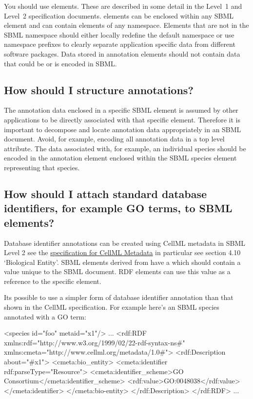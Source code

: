 \documentclass{sbmlfaq}
\begin{document}
You should use  elements.  These are described in some detail in the Level~1 and Level~2
specification documents.   elements can be enclosed within any SBML element and can contain
elements of any namespace. Elements that are not in the SBML namespace should either locally redefine the default namespace
or use namespace prefixes to clearly separate application specific data from different software packages.
Data stored in annotation elements should not contain data that could be or is encoded in SBML.  

\subsection{How should I structure annotations?}

The annotation data enclosed in a specific SBML element is
assumed by other applications to be directly associated with that specific element.
Therefore it is important to decompose and locate annotation data appropriately in an SBML document.
Avoid, for example, encoding all annotation data in a top level attribute.
The data associated
with, for example, an individual species should be encoded in the annotation element enclosed within
the SBML species element representing that species.

\subsection{How should I attach standard database identifiers, for example GO terms, to SBML elements?}

Database identifier annotations can be created using CellML metadata in SBML Level 2 see the
\href{http://www.cellml.com/public/metadata/cellml_metadata_specification.html}{specification for CellML Metadata}
in particular see section 4.10  `Biological Entity'.  SBML elements derived from  have a 
which should contain a value unique to the SBML document.  RDF elements can use this value as a reference to the specific
element.

Its possible to use a simpler form of database identifier annotation than that shown
in the CellML specification.  For example here's an SBML species annotated with a GO term:

\begin{example}
<species id="foo" metaid="x1"/>
...
<rdf:RDF xmlns:rdf="http://www.w3.org/1999/02/22-rdf-syntax-ns#"
         xmlns:cmeta="http://www.cellml.org/metadata/1.0#">
  <rdf:Description about="#x1">
    <cmeta:bio_entity>
         <cmeta:identifier rdf:parseType="Resource">
            <cmeta:identifier_scheme>GO Consortium</cmeta:identifier_scheme>
            <rdf:value>GO:0048038</rdf:value>
          </cmeta:identifier>   
    </cmeta:bio-entity>
  </rdf:Description>
</rdf:RDF> 
...
\end{example}
\end{document}
